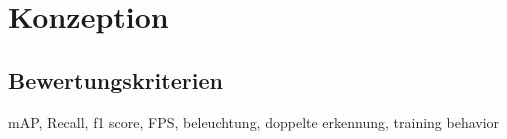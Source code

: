 \chapter{Konzeption}

\section{Bewertungskriterien}

mAP, Recall, f1 score, FPS, beleuchtung, doppelte erkennung, training behavior